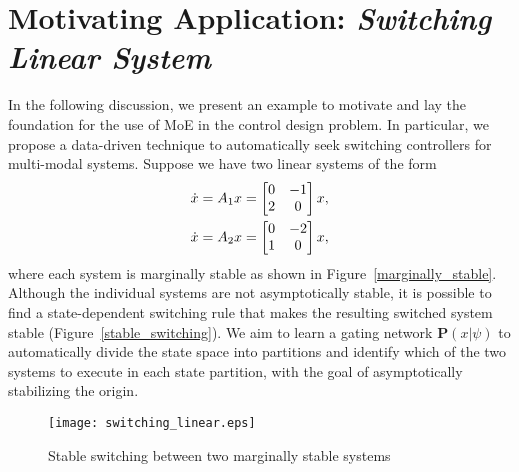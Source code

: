 \section{Motivating Application: \textit{Switching Linear System}}
\label{sec:motiviational_application}

In the following discussion, we present an example to motivate and lay
the foundation for the use of MoE in the control design problem. 
%
In particular, we propose a data-driven technique to automatically seek
switching controllers for multi-modal systems.
%  
Suppose we have two linear systems of the form 
\begin{equation}
    \begin{gathered}
        \dot{x} = A_1x = \begin{bmatrix}0 & -1 \\ 2 & 0\end{bmatrix}x, \\
        \dot{x} = A_2x = \begin{bmatrix}0 & -2 \\ 1 & 0\end{bmatrix}x,
    \end{gathered}
    \label{eq:unstable_closedloop}
\end{equation}
\noindent where each system is marginally stable as shown in
Figure~\ref{marginally_stable}.
%
Although the individual systems are not asymptotically stable, it is possible to
find a state-dependent switching rule that makes the resulting switched system
stable\cite{liberzon2003switching} (Figure~\ref{stable_switching}). 
%
We aim to learn a gating network $\mathbf{P}(x|\psi)$ to automatically divide
the state space into partitions and identify which of the two systems to execute
in each state partition, with the goal of asymptotically stabilizing the origin.
%
\begin{figure}[tb]
    \centering
    \texttt{[image: switching\_linear.eps]}
    \caption{Stable switching between two marginally stable systems }
    \label{fig:stableSwitching}
\end{figure}

